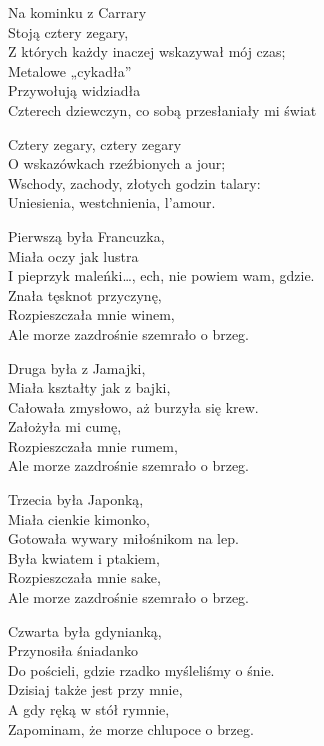 \begin{text}
    Na kominku z Carrary\\
    Stoją cztery zegary,\\
    Z których każdy inaczej wskazywał mój czas;\\
    Metalowe „cykadła”\\
    Przywołują widziadła\\
    Czterech dziewczyn, co sobą przesłaniały mi świat

    \vin Cztery zegary, cztery zegary\\
    \vin O wskazówkach rzeźbionych a jour;\\
    \vin Wschody, zachody, złotych godzin talary:\\
    \vin Uniesienia, westchnienia, l’amour.

    Pierwszą była Francuzka,\\
    Miała oczy jak lustra\\
    I pieprzyk maleńki…, ech, nie powiem wam, gdzie.\\
    Znała tęsknot przyczynę,\\
    Rozpieszczała mnie winem,\\
    Ale morze zazdrośnie szemrało o brzeg.

    Druga była z Jamajki,\\
    Miała kształty jak z bajki,\\
    Całowała zmysłowo, aż burzyła się krew.\\
    Założyła mi cumę,\\
    Rozpieszczała mnie rumem,\\
    Ale morze zazdrośnie szemrało o brzeg.

    Trzecia była Japonką,\\
    Miała cienkie kimonko,\\
    Gotowała wywary miłośnikom na lep.\\
    Była kwiatem i ptakiem,\\
    Rozpieszczała mnie sake,\\
    Ale morze zazdrośnie szemrało o brzeg.

    Czwarta była gdynianką,\\
    Przynosiła śniadanko\\
    Do pościeli, gdzie rzadko myśleliśmy o śnie.\\
    Dzisiaj także jest przy mnie,\\
    A gdy ręką w stół rymnie,\\
    Zapominam, że morze chlupoce o brzeg.
\end{text}
